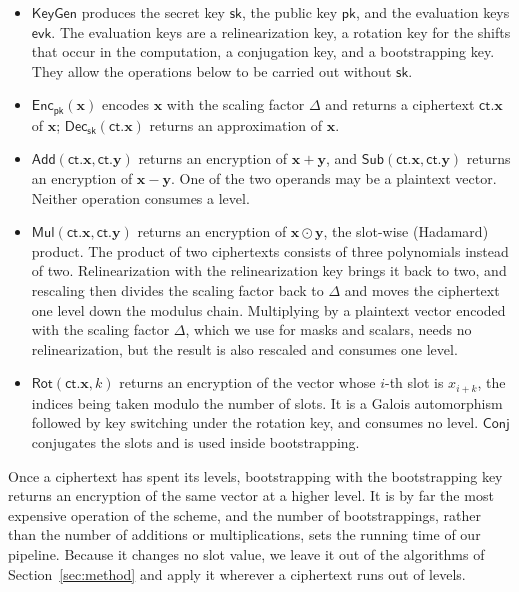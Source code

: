 \begin{itemize}
\item $\mathsf{KeyGen}$ produces the secret key $\mathsf{sk}$, the public
  key $\mathsf{pk}$, and the evaluation keys $\mathsf{evk}$. The
  evaluation keys are a relinearization key, a rotation key for the
  shifts that occur in the computation, a conjugation key, and a
  bootstrapping key. They allow the operations below to be carried out
  without $\mathsf{sk}$.
\item $\mathsf{Enc}_{\mathsf{pk}}(\mathbf{x})$ encodes $\mathbf{x}$ with
  the scaling factor $\Delta$ and returns a ciphertext
  $\mathsf{ct}.\mathbf{x}$ of $\mathbf{x}$;
  $\mathsf{Dec}_{\mathsf{sk}}(\mathsf{ct}.\mathbf{x})$ returns an
  approximation of $\mathbf{x}$.
\item $\mathsf{Add}(\mathsf{ct}.\mathbf{x}, \mathsf{ct}.\mathbf{y})$
  returns an encryption of $\mathbf{x} + \mathbf{y}$, and
  $\mathsf{Sub}(\mathsf{ct}.\mathbf{x}, \mathsf{ct}.\mathbf{y})$ returns
  an encryption of $\mathbf{x} - \mathbf{y}$. One of the two operands may
  be a plaintext vector. Neither operation consumes a level.
\item $\mathsf{Mul}(\mathsf{ct}.\mathbf{x}, \mathsf{ct}.\mathbf{y})$
  returns an encryption of $\mathbf{x} \odot \mathbf{y}$, the slot-wise
  (Hadamard) product. The product of two ciphertexts consists of three
  polynomials instead of two. Relinearization with the relinearization
  key brings it back to two, and rescaling then divides the scaling factor
  back to $\Delta$ and moves the ciphertext one level down the modulus
  chain. Multiplying by a plaintext vector encoded with the scaling factor
  $\Delta$, which we use for masks and scalars, needs no relinearization,
  but the result is also rescaled and consumes one level.
\item $\mathsf{Rot}(\mathsf{ct}.\mathbf{x}, k)$ returns an encryption of
  the vector whose $i$-th slot is $x_{i+k}$, the indices being taken
  modulo the number of slots. It is a Galois automorphism followed by key
  switching under the rotation key, and consumes no level.
  $\mathsf{Conj}$ conjugates the slots and is used inside bootstrapping.
\end{itemize}

Once a ciphertext has spent its levels, bootstrapping with the
bootstrapping key returns an encryption of the same vector at a higher
level. It is by far the most expensive operation of the scheme, and the
number of bootstrappings, rather than the number of additions or
multiplications, sets the running time of our pipeline. Because it
changes no slot value, we leave it out of the algorithms of
Section~\ref{sec:method} and apply it wherever a ciphertext runs out of
levels.


